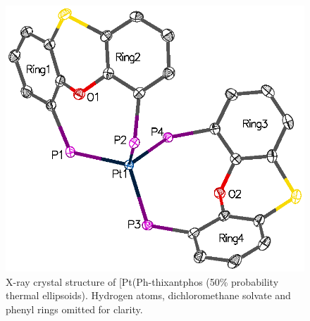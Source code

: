 \begin{figure}[htbp]
\begin{center}
\includegraphics[scale=0.82]{../Figures/MRMNANlabelled2.eps}
\caption[X-ray crystal structure of [Pt(Ph-thixantphos\ce{)2]}]{X-ray crystal structure of [Pt(Ph-thixantphos\ce{)2]} (50\% probability thermal ellipsoids). Hydrogen atoms, dichloromethane solvate and phenyl rings omitted for clarity.}
\label{crystalbisthixantphosplatinumphenyl}
\end{center}
\end{figure}
\vspace{0.2cm}

